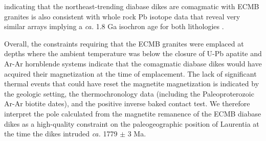 \documentclass[draft]{agujournal2019}
\begin{document}
indicating that the northeast-trending diabase dikes are comagmatic with ECMB granites is also consistent with whole rock Pb isotope data that reveal very similar arrays implying a \textit{ca.} 1.8 Ga isochron age for both lithologies \cite{Horan1987a}. 


Overall, the constraints requiring that the ECMB granites were emplaced at depths where the ambient temperature was below the closure of U-Pb apatite and Ar-Ar hornblende systems indicate that the comagmatic diabase dikes would have acquired their magnetization at the time of emplacement. The lack of significant thermal events that could have reset the magnetite magnetization is indicated by the geologic setting, the thermochronology data (including the Paleoproterozoic Ar-Ar biotite dates), and the positive inverse baked contact test. We therefore interpret the pole calculated from the magnetite remanence of the ECMB diabase dikes as a high-quality constraint on the paleogeographic position of Laurentia at the time the dikes intruded \textit{ca.} 1779 $\pm$ 3 Ma.
\end{document}
